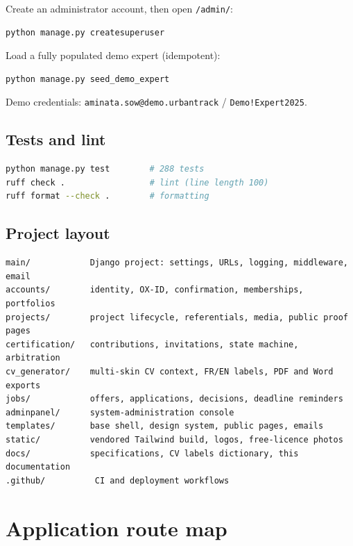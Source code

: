 \documentclass[11pt,a4paper]{article}
\begin{document}
Create an administrator account, then open \texttt{/admin/}:

\begin{lstlisting}[language=bash]
python manage.py createsuperuser
\end{lstlisting}

Load a fully populated demo expert (idempotent):

\begin{lstlisting}[language=bash]
python manage.py seed_demo_expert
\end{lstlisting}

Demo credentials: \texttt{aminata.sow@demo.urbantrack} /
\texttt{Demo!Expert2025}.

\subsection{Tests and lint}

\begin{lstlisting}[language=bash]
python manage.py test        # 288 tests
ruff check .                 # lint (line length 100)
ruff format --check .        # formatting
\end{lstlisting}

\subsection{Project layout}

\begin{lstlisting}
main/            Django project: settings, URLs, logging, middleware, email
accounts/        identity, OX-ID, confirmation, memberships, portfolios
projects/        project lifecycle, referentials, media, public proof pages
certification/   contributions, invitations, state machine, arbitration
cv_generator/    multi-skin CV context, FR/EN labels, PDF and Word exports
jobs/            offers, applications, decisions, deadline reminders
adminpanel/      system-administration console
templates/       base shell, design system, public pages, emails
static/          vendored Tailwind build, logos, free-licence photos
docs/            specifications, CV labels dictionary, this documentation
.github/          CI and deployment workflows
\end{lstlisting}

\appendix

\section{Application route map}
\label{app:routes}
\end{document}
